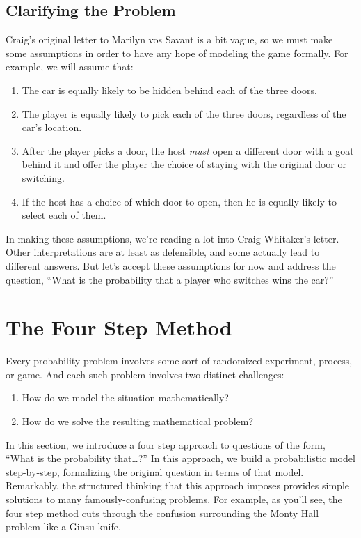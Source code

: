 \subsection{Clarifying the Problem}

Craig's original letter to Marilyn vos Savant is a bit vague, so we
must make some assumptions in order to have any hope of modeling the
game formally.  For example, we will assume that:
\begin{enumerate}

\item The car is equally likely to be hidden behind each of the three
doors.

\item The player is equally likely to pick each of the three doors,
regardless of the car's location.

\item After the player picks a door, the host \emph{must} open a
different door with a goat behind it and offer the player the choice
of staying with the original door or switching.

\item If the host has a choice of which door to open, then he is
equally likely to select each of them.

\end{enumerate}
%
In making these assumptions, we're reading a lot into Craig Whitaker's
letter.  Other interpretations are at least as defensible, and some
actually lead to different answers.  But let's accept these
assumptions for now and address the question, ``What is the
probability that a player who switches wins the car?''

\section{The Four Step Method}\label{4step_sec}

Every probability problem involves some sort of randomized experiment,
process, or game.  And each such problem involves two distinct
challenges:
%
\begin{enumerate}
\item How do we model the situation mathematically?
\item How do we solve the resulting mathematical problem?
\end{enumerate}
%
In this section, we introduce a four step approach to questions of the
form, ``What is the probability that\dots?''  In this approach, we build
a probabilistic model step-by-step, formalizing the original question in
terms of that model.  Remarkably, the structured thinking that this
approach imposes provides simple solutions to many famously-confusing
problems.  For example, as you'll see, the four step method cuts through
the confusion surrounding the Monty Hall problem like a Ginsu knife.

